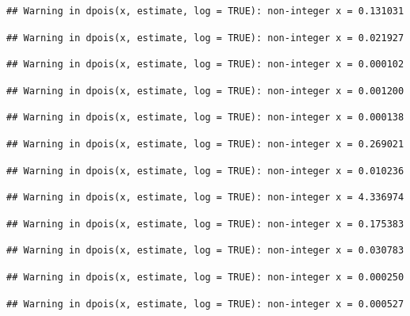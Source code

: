 \documentclass[]{article}
\begin{document}
\begin{verbatim}
## Warning in dpois(x, estimate, log = TRUE): non-integer x = 0.131031
\end{verbatim}

\begin{verbatim}
## Warning in dpois(x, estimate, log = TRUE): non-integer x = 0.021927
\end{verbatim}

\begin{verbatim}
## Warning in dpois(x, estimate, log = TRUE): non-integer x = 0.000102
\end{verbatim}

\begin{verbatim}
## Warning in dpois(x, estimate, log = TRUE): non-integer x = 0.001200
\end{verbatim}

\begin{verbatim}
## Warning in dpois(x, estimate, log = TRUE): non-integer x = 0.000138
\end{verbatim}

\begin{verbatim}
## Warning in dpois(x, estimate, log = TRUE): non-integer x = 0.269021
\end{verbatim}

\begin{verbatim}
## Warning in dpois(x, estimate, log = TRUE): non-integer x = 0.010236
\end{verbatim}

\begin{verbatim}
## Warning in dpois(x, estimate, log = TRUE): non-integer x = 4.336974
\end{verbatim}

\begin{verbatim}
## Warning in dpois(x, estimate, log = TRUE): non-integer x = 0.175383
\end{verbatim}

\begin{verbatim}
## Warning in dpois(x, estimate, log = TRUE): non-integer x = 0.030783
\end{verbatim}

\begin{verbatim}
## Warning in dpois(x, estimate, log = TRUE): non-integer x = 0.000250
\end{verbatim}

\begin{verbatim}
## Warning in dpois(x, estimate, log = TRUE): non-integer x = 0.000527
\end{verbatim}
\end{document}
